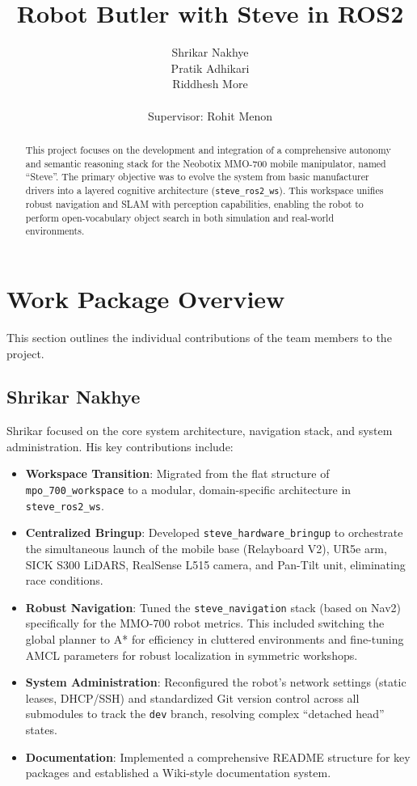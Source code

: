 \documentclass[12pt,oneside,a4paper]{article}
\title{\LARGE \bf Robot Butler with Steve in ROS2}
\author{Shrikar Nakhye \\ Pratik Adhikari \\ Riddhesh More \\ \\ Supervisor: Rohit Menon}
\begin{document}


\maketitle


\begin{abstract}
This project focuses on the development and integration of a comprehensive autonomy and semantic reasoning stack for the Neobotix MMO-700 mobile manipulator, named ``Steve''. The primary objective was to evolve the system from basic manufacturer drivers into a layered cognitive architecture (\texttt{steve\_ros2\_ws}). This workspace unifies robust navigation and SLAM with perception capabilities, enabling the robot to perform open-vocabulary object search in both simulation and real-world environments.
\end{abstract}
\newpage


\section{Work Package Overview}
\label{sec:work_package}

This section outlines the individual contributions of the team members to the project.

\subsection{Shrikar Nakhye}
Shrikar focused on the core system architecture, navigation stack, and system administration. His key contributions include:
\begin{itemize}
    \item \textbf{Workspace Transition}: Migrated from the flat structure of \texttt{mpo\_700\_workspace} to a modular, domain-specific architecture in \texttt{steve\_ros2\_ws}.
    \item \textbf{Centralized Bringup}: Developed \texttt{steve\_hardware\_bringup} to orchestrate the simultaneous launch of the mobile base (Relayboard V2), UR5e arm, SICK S300 LiDARS, RealSense L515 camera, and Pan-Tilt unit, eliminating race conditions.
    \item \textbf{Robust Navigation}: Tuned the \texttt{steve\_navigation} stack (based on Nav2) specifically for the MMO-700 robot metrics. This included switching the global planner to A* for efficiency in cluttered environments and fine-tuning AMCL parameters for robust localization in symmetric workshops.
    \item \textbf{System Administration}: Reconfigured the robot's network settings (static leases, DHCP/SSH) and standardized Git version control across all submodules to track the \texttt{dev} branch, resolving complex ``detached head'' states.
    \item \textbf{Documentation}: Implemented a comprehensive README structure for key packages and established a Wiki-style documentation system.
\end{itemize}
\end{document}

